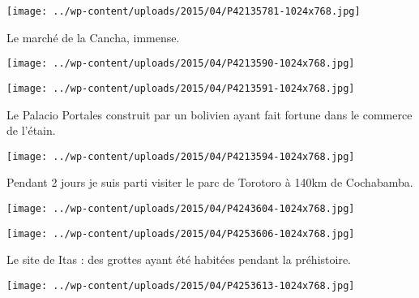  

 

\begin{center} \texttt{[image: ../wp-content/uploads/2015/04/P42135781-1024x768.jpg]} \end{center}

 

 Le marché de la Cancha, immense. 

 

\begin{center} \texttt{[image: ../wp-content/uploads/2015/04/P4213590-1024x768.jpg]} \end{center}

 

 

\begin{center} \texttt{[image: ../wp-content/uploads/2015/04/P4213591-1024x768.jpg]} \end{center}

 

 Le Palacio Portales construit par un bolivien ayant fait fortune dans le commerce de l'étain. 

 

\begin{center} \texttt{[image: ../wp-content/uploads/2015/04/P4213594-1024x768.jpg]} \end{center}

 

 Pendant 2 jours je suis parti visiter le parc de Torotoro à 140km de Cochabamba. 

 

\begin{center} \texttt{[image: ../wp-content/uploads/2015/04/P4243604-1024x768.jpg]} \end{center}

 

 

\begin{center} \texttt{[image: ../wp-content/uploads/2015/04/P4253606-1024x768.jpg]} \end{center}

 

 Le site de Itas : des grottes ayant été habitées pendant la préhistoire. 

 

\begin{center} \texttt{[image: ../wp-content/uploads/2015/04/P4253613-1024x768.jpg]} \end{center}

